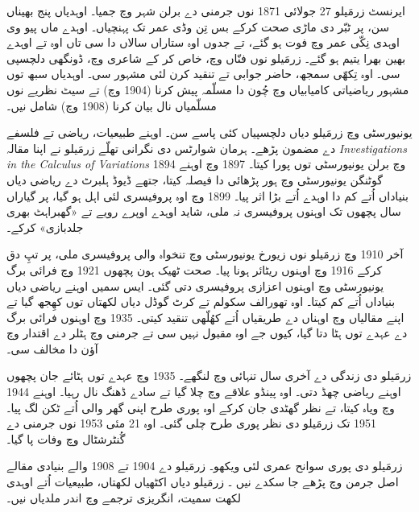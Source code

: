 \documentclass[../../../include/open-logic-section]{subfiles}
\begin{document}



ایرنسٹ زرمَیلو 27 جولائی 1871 نوں جرمنی دے برلن شہر وچ جمیا۔ اوہدیاں پنج بھیناں سن، پر ٹبّر دی ماڑی صحت کرکے بس تِن وڈی عمر تک پہنچیاں۔ اوہدے ماں پیو وی اوہدی نِکّی عمر وچ فوت ہو گئے، تے جدوں اوہ ستاراں سالاں دا سی تاں اوہ تے اوہدے بھین بھرا یتیم ہو گئے۔ زرمَیلو نوں فنّاں وچ، خاص کر کے شاعری وچ، ڈونگھی دلچسپی سی۔ اوہ تِکھّی سمجھ، حاضر جوابی تے تنقید کرن لئی مشہور سی۔ اوہدیاں سبھ توں مشہور ریاضیاتی کامیابیاں وچ چُون دا مسلّمہ پیش کرنا (1904 وچ) تے سیٹ نظریے نوں مسلّمیاں نال بیان کرنا (1908 وچ) شامل نیں۔

یونیورسٹی وچ زرمَیلو دیاں دلچسپیاں کئی پاسے سن۔ اوہنے طبیعیات، ریاضی تے فلسفے دے مضمون پڑھے۔ ہرمان شوارٹس دی نگرانی تھلّے زرمَیلو نے اپنا مقالہ \emph{Investigations in
  the Calculus of Variations} 1894 وچ برلن یونیورسٹی توں پورا کیتا۔ 1897 وچ اوہنے گوٹنگن یونیورسٹی وچ ہور پڑھائی دا فیصلہ کیتا، جتھے ڈیوڈ ہلبرٹ دے ریاضی دیاں بنیاداں اُتے کم دا اوہدے اُتے بڑا اثر پیا۔ 1899 وچ اوہ پروفیسری لئی اہل ہو گیا، پر گیاراں سال پچھوں تک اوہنوں پروفیسری نہ ملی، شاید اوہدے اوپرے رویے تے «گھبراہٹ بھری جلدبازی» کرکے۔

آخر 1910 وچ زرمَیلو نوں زیورخ یونیورسٹی وچ تنخواہ والی پروفیسری ملی، پر تپِ دق کرکے 1916 وچ اوہنوں ریٹائر ہونا پیا۔ صحت ٹھیک ہون پچھوں 1921 وچ فرائی برگ یونیورسٹی وچ اوہنوں اعزازی پروفیسری دتی گئی۔ ایس سمیں اوہنے ریاضی دیاں بنیاداں اُتے کم کیتا۔ اوہ تھورالف سکولم تے کرٹ گوڈل دیاں لکھتاں توں کھِجھ گیا تے اپنے مقالیاں وچ اوہناں دے طریقیاں اُتے کھُلّھی تنقید کیتی۔ 1935 وچ اوہنوں فرائی برگ دے عہدے توں ہٹا دتا گیا، کیوں جے اوہ مقبول نہیں سی تے جرمنی وچ ہٹلر دے اقتدار وچ آؤن دا مخالف سی۔

زرمَیلو دی زندگی دے آخری سال تنہائی وچ لنگھے۔ 1935 وچ عہدے توں ہٹائے جان پچھوں اوہنے ریاضی چھڈ دتی۔ اوہ پینڈو علاقے وچ چلا گیا تے سادے ڈھنگ نال رہیا۔ اوہنے 1944 وچ ویاہ کیتا، تے نظر گھٹدی جان کرکے اوہ پوری طرح اپنی گھر والی اُتے ٹکن لگ پیا۔ 1951 تک زرمَیلو دی نظر پوری طرح چلی گئی۔ اوہ 21 مئی 1953 نوں جرمنی دے گُنٹرشٹال وچ وفات پا گیا۔

\begin{reading}
زرمَیلو دی پوری سوانح عمری لئی \citet{Ebbinghaus2015} ویکھو۔ زرمَیلو دے 1904 تے 1908 والے بنیادی مقالے اصل جرمن وچ پڑھے جا سکدے نیں \citep{Zermelo1904,Zermelo1908}۔ زرمَیلو دیاں اکٹھیاں لکھتاں، طبیعیات اُتے اوہدی لکھت سمیت، انگریزی ترجمے وچ \citep{Ebbinghaus2010,Ebbinghaus2013} اندر ملدیاں نیں۔
\end{reading}
\end{document}
